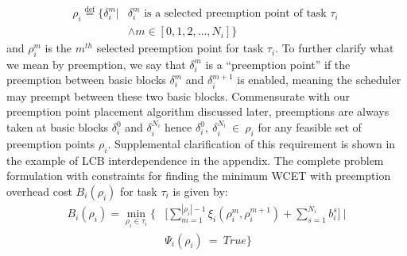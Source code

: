 \begin{equation*}\label{eqn:pp-set}
\begin{split}
   \rho_{i} \stackrel{\text{def}}{=} \{\delta_{i}^{m}|&\delta_{i}^{m} \text{ is a selected preemption point of task } \tau_{i}\ \\ &\wedge m \in [0, 1, 2, \ldots, N_{i}]\}
\end{split}
\end{equation*}
%
\noindent
and \begin{math}\rho_{i}^{m}\end{math} is the \textrm{$m^{th}$} selected preemption point for task \begin{math}\tau_{i}\end{math}.  To further clarify what we mean by preemption, we say that $\delta_i^m$ is a ``preemption point'' if the preemption between basic blocks $\delta_i^m$ and $\delta_i^{m+1}$ is enabled, meaning the scheduler may preempt between these two basic blocks.  Commensurate with our preemption point placement algorithm discussed later, preemptions are always taken at basic blocks $\delta_i^0$ and $\delta_i^{N_i}$ hence $\delta_i^0,\ \delta_i^{N_i}\ \in\ \rho_{i}$ for any feasible set of preemption points $\rho_i$.  Supplemental clarification of this requirement is shown in the example of LCB interdependence in the appendix.
%
\noindent
The complete problem formulation with constraints for finding the minimum WCET with preemption overhead cost \begin{math}B_{i}(\rho_{i})\end{math} for task \begin{math}\tau_{i}\end{math} is given by:
\begin{equation}\label{eqn:global-bbkwcet-cost}
\begin{split}
   B_{i}(\rho_{i}) = \min_{\rho_{i} \in \tau_{i}} \Big\{&\Big[\sum_{m=1}^{|\rho_{i}|-1} \xi_{i}(\rho_{i}^{m},\rho_{i}^{m+1}) + \sum_{s=1}^{N_i}b_{i}^{s}\Big]\ |\\
   &\Psi_{i}(\rho_{i})\ =\ True\Big\}
\end{split}
\end{equation}
